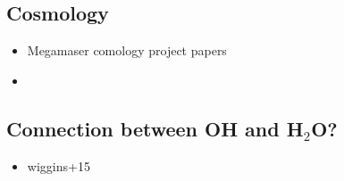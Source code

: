 \subsection{Cosmology}
\label{sub:h2o_cosmo}

\begin{itemize}
\item Megamaser comology project papers
\item 
\end{itemize}

\subsection{Connection between OH and H$_2$O?}
\label{sec:oh_and_h2o}

\begin{itemize}
\item wiggins+15
\end{itemize}